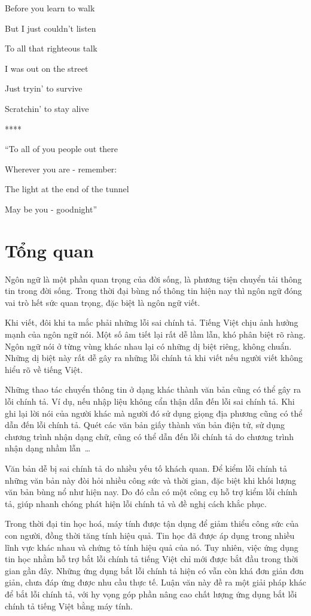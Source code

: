 \documentclass[a4paper,oneside]{book} %
\theoremstyle{break}
\begin{document}
\begin{center}
Before you learn to walk

But I just couldn't listen

To all that righteous talk

I was out on the street

Just tryin' to survive

Scratchin' to stay alive


****


``To all of you people out there

Wherever you are - remember:

The light at the end of the tunnel

May be you - goodnight''
\end{center}


\chapter{Tổng quan}
\label{cha:overview}
\minitoc


Ngôn ngữ là một phần quan trọng của đời sống, là phương tiện chuyển
tải thông tin trong đời sống. Trong thời đại bùng nổ thông tin hiện
nay thì ngôn ngữ đóng vai trò hết sức quan trọng, đặc biệt là ngôn ngữ
viết. 

Khi viết, đôi khi ta mắc phải những lỗi sai chính tả. Tiếng
Việt chịu ảnh hưởng mạnh của ngôn ngữ nói. Một số âm tiết lại rất dễ
lầm lẫn, khó phân biệt rõ ràng. Ngôn ngữ nói ở từng vùng khác nhau lại
có những dị biệt riêng, không chuẩn. Những dị biệt này rất dễ gây ra
những lỗi chính tả khi viết nếu người viết không hiểu rõ về tiếng
Việt.

Những thao tác chuyển thông tin ở dạng khác thành văn bản cũng có thể
gây ra lỗi chính tả. Ví dụ, nếu nhập liệu không cẩn thận dẫn đến lỗi
sai chính tả. Khi ghi lại lời nói của người khác mà người đó sử dụng
giọng địa phương cũng có thể dẫn đến lỗi chính tả. Quét các văn bản
giấy thành văn bản điện tử, sử dụng chương trình nhận dạng chữ, cũng
có thể dẫn đến lỗi chính tả do chương trình nhận dạng nhầm lẫn~\ldots

Văn bản dễ bị sai chính tả do nhiều yếu tố khách quan. Để kiểm lỗi
chính tả những văn bản này đòi hỏi nhiều công sức và thời gian, đặc
biệt khi khối lượng văn bản bùng nổ như hiện nay. Do đó cần có một
công cụ hỗ trợ kiểm lỗi chính tả, giúp nhanh chóng phát hiện lỗi chính
tả và đề nghị cách khắc phục.

Trong thời đại tin học hoá, máy tính được tận dụng để giảm thiểu công
sức của con người, đồng thời tăng tính hiệu quả. Tin học đã được áp
dụng trong nhiều lĩnh vực khác nhau và chứng tỏ tính hiệu quả của
nó. Tuy nhiên, việc ứng dụng tin học nhằm hỗ trợ bắt lỗi
chính tả tiếng Việt chỉ mới được bắt đầu trong thời gian gần
đây. Những ứng dụng bắt lỗi chính tả hiện có vẫn còn khá đơn giản đơn
giản, chưa đáp ứng được nhu cầu thực tế. Luận văn này đề ra một giải
pháp khác để bắt lỗi chính tả, với hy vọng góp phần nâng cao chất
lượng ứng dụng bắt lỗi chính tả tiếng Việt bằng máy tính.
\end{document}
